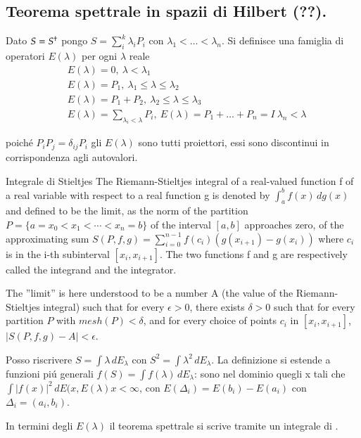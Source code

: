 \documentclass[oneside,12pt]{memoir}
\begin{document}
\subsection{Teorema spettrale in spazii di Hilbert (??).}

Dato $S={{S}^{\dag}}$ pongo $S=\sum_i^k\lambda_iP_i$ con $\lambda_1<\ldots<\lambda_n$. Si definisce una famiglia di operatori $E(\lambda)$ per ogni $\lambda$ reale
\begin{align*}
&E(\lambda)=0,\ \lambda<\lambda_1\\
&E(\lambda)=P_1,\ \lambda_1\leq\lambda\leq\lambda_2\\
&E(\lambda)=P_1+P_2,\ \lambda_2\leq\lambda\leq\lambda_3\\
&E(\lambda)=\sum_{\lambda_i<\lambda}P_i,\ E(\lambda)=P_1+\ldots+P_n=I\ \lambda_n<\lambda
\end{align*}

poich\'e $P_iP_j=\delta_{ij}P_i$ gli $E(\lambda)$ sono tutti proiettori, essi sono discontinui in corrispondenza agli autovalori.

\begin{definition}{Integrale di Stieltjes}
The Riemann-Stieltjes integral of a real-valued function f of a real variable with respect to a real function g is denoted by $\int_a^b f(x) \, dg(x)$ and defined to be the limit, as the norm of the partition $P=\{ a = x_0 < x_1 < \cdots < x_n = b\}$ of the interval $[a, b]$ approaches zero, of the approximating sum $S(P,f,g) = \sum_{i=0}^{n-1} f(c_i)(g(x_{i+1})-g(x_i))$ where $c_i$ is in the i-th subinterval $[x_i, x_{i+1}]$. The two functions f and g are respectively called the integrand and the integrator.

The ''limit'' is here understood to be a number A (the value of the Riemann-Stieltjes integral) such that for every $\epsilon> 0$, there exists $\delta > 0$ such that for every partition $P$ with $mesh(P) < \delta$, and for every choice of points $c_i$ in $[x_i, x_{i+1}]$, $|S(P,f,g)-A| < \epsilon$.

\end{definition}

Posso riscrivere $S=\int\lambda\,dE_{\lambda}$ con $S^2=\int\lambda^2\,dE_{\lambda}$. La definizione si estende a funzioni pi\'u generali $f(S)=\int f(\lambda)\,dE_{\lambda}$: sono nel dominio quegli x tali che $\int|f(x)|^2\,dE(x,E(\lambda)x<\infty$, con $E(\Delta_i)=E(b_i)-E(a_i)$ con $\Delta_i=(a_i,b_i)$.


In termini degli $E(\lambda)$ il teorema spettrale si scrive tramite un integrale di \sti{}.
\end{document}
